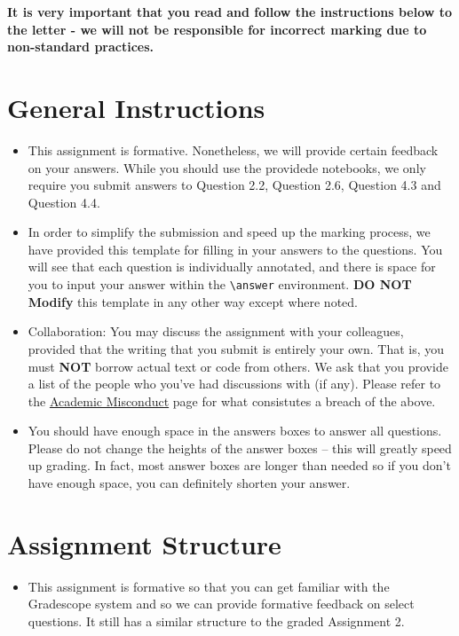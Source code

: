 \documentclass[12pt]{article}
\begin{document}
\maketitle
\thispagestyle{empty}


\noindent \textbf{It is very important that you read and follow the instructions below to the letter - we will not be responsible for incorrect marking due to non-standard practices.}

\section*{General Instructions}
\begin{itemize}
\item This assignment is formative. Nonetheless, we will provide certain feedback on your answers. While you should use the providede notebooks, we only require you submit answers to Question 2.2, Question 2.6, Question 4.3 and Question 4.4.
\item In order to simplify the submission and speed up the marking process, we have provided this template for filling in your answers to the questions. You will see that each question is individually annotated, and there is space for you to input your answer within the \texttt{\textbackslash answer} environment. \textbf{DO NOT Modify} this template in any other way except where noted.
\item Collaboration: You may discuss the assignment with your colleagues, provided that the writing that you submit is entirely your own. That is, you must \textbf{NOT} borrow actual text or code from others. We ask that you provide a list of the people who you've had discussions with (if any). Please refer to the \href{http://web.inf.ed.ac.uk/infweb/admin/policies/academic-misconduct}{Academic Misconduct} page for what consistutes a breach of the above.
\item You should have enough space in the answers boxes to answer all questions. Please do not change the heights of the answer boxes -- this will greatly speed up grading. In fact, most answer boxes are longer than needed so if you don't have enough space, you can definitely shorten your answer.
\end{itemize}

\section*{Assignment Structure}
\begin{itemize}
\item This assignment is formative so that you can get familiar with the Gradescope system and so we can provide formative feedback on select questions. It still has a similar structure to the graded Assignment 2. 
\end{itemize}
\end{document}

